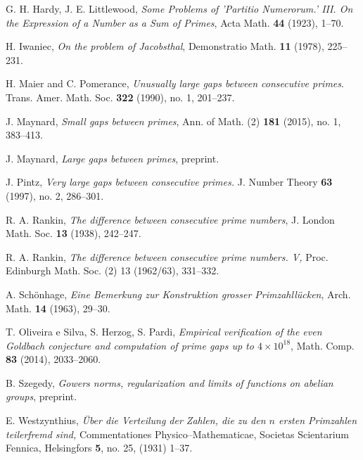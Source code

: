 \documentclass[11pt]{amsart}
\numberwithin{equation}{section}  %
\theoremstyle{remark}
\theoremstyle{plain}
\numberwithin{equation}{section}
\renewcommand{\(}{\left(}
\renewcommand{\)}{\right)}
\begin{document}
\begin{thebibliography}{999}
G. H. Hardy, J. E. Littlewood, \emph{Some Problems of 'Partitio Numerorum.' III. On the Expression of a Number as a Sum of Primes}, Acta Math. \textbf{44} (1923), 1--70.

 H. Iwaniec, \emph{On the problem of Jacobsthal}, Demonstratio
Math. \textbf{11} (1978), 225--231.

 H. Maier and C. Pomerance, {\it Unusually large gaps
between consecutive primes}. Trans. Amer. Math. Soc. {\bf 322} (1990), no. 1, 201--237.

J. Maynard, \emph{Small gaps between primes}, Ann. of Math. (2) \textbf{181} (2015), no. 1, 383--413.

J. Maynard, \emph{Large gaps between primes}, preprint.

 J. Pintz, {\it Very large gaps between consecutive primes.}
J. Number Theory {\bf 63} (1997), no. 2, 286--301.

 R. A. Rankin, \textit{The difference between consecutive prime
numbers}, J. London Math. Soc. \textbf{13} (1938), 242--247.

 R. A. Rankin, \emph{The difference between consecutive prime numbers. V,} Proc. Edinburgh Math. Soc. (2) 13 (1962/63), 331--332.

 A. Sch\"onhage, \emph{Eine Bemerkung zur Konstruktion 
grosser Primzahll\"ucken}, Arch. Math. \textbf{14} (1963), 29--30.

 T. Oliveira e Silva, S. Herzog, S. Pardi, \emph{Empirical verification of the even Goldbach conjecture and computation of prime gaps up to $4 \times 10^{18}$}, Math. Comp. \textbf{83} (2014), 2033--2060.

B. Szegedy, \emph{Gowers norms, regularization and limits of functions on abelian groups}, preprint.

 E. Westzynthius, \emph{\"Uber die Verteilung der Zahlen, 
die zu den $n$ ersten Primzahlen teilerfremd sind,} Commentationes 
Physico--Mathematicae, 
Societas Scientarium Fennica, Helsingfors \textbf{5}, no. 25, (1931) 1--37.

\end{thebibliography}
\end{document}
